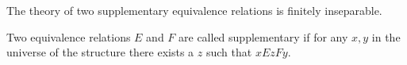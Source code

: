 The theory of two supplementary equivalence relations is finitely inseparable.

Two equivalence relations $E$ and $F$ are called supplementary if for any $x, y$ in the universe of the structure there exists a $z$ such that $xEzFy$.
